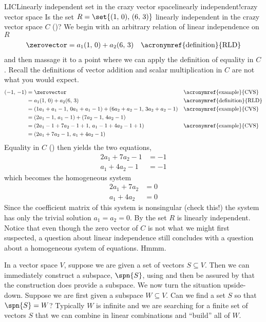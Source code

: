 \begin{example}{LIC}{Linearly independent set in the crazy vector space}{linearly independent!crazy vector space}
Is the set $R=\set{(1,\,0),\,(6,\,3)}$ linearly independent in the crazy vector space $C$ ()?  We begin with an arbitrary relation of linear independence on $R$
%
\begin{align*}
\zerovector &= a_1(1,\,0) + a_2(6,\,3)&&\text{\acronymref{definition}{RLD}}\\
\end{align*}
%
and then massage it to a point where we can apply the definition of equality in $C$.  Recall the definitions of vector addition and scalar multiplication in $C$ are not what you would expect.
%
\begin{align*}
(-1,\,-1)
&=\zerovector
&&\text{\acronymref{example}{CVS}}\\
%
&=a_1(1,\,0) + a_2(6,\,3)
&&\text{\acronymref{definition}{RLD}}\\
%
&=(1a_1+a_1-1,\,0a_1+a_1-1) + (6a_2+a_2-1,\,3a_2+a_2-1)
&&\text{\acronymref{example}{CVS}}\\
%
&=(2a_1-1,\,a_1-1) + (7a_2-1,\,4a_2-1)\\
%
&=(2a_1-1+7a_2-1+1,\,a_1-1+4a_2-1+1)
&&\text{\acronymref{example}{CVS}}\\
%
&=(2a_1+7a_2-1,\,a_1+4a_2-1)
\end{align*}
%
Equality in $C$ () then yields the two equations,
%
\begin{align*}
2a_1+7a_2-1&=-1\\
a_1+4a_2-1&=-1
\end{align*}
%
which becomes the homogeneous system
%
\begin{align*}
2a_1+7a_2&=0\\
a_1+4a_2&=0
\end{align*}
%
Since the coefficient matrix of this system is nonsingular (check this!) the system has only the trivial solution $a_1=a_2=0$.  By  the set $R$ is linearly independent.  Notice that even though the zero vector of $C$ is not what we might first suspected, a question about linear independence still concludes with a question about a homogeneous system of equations.  Hmmm.
%
\end{example}
%
%
In a vector space $V$, suppose we are given a set of vectors $S\subseteq V$.  Then we can immediately construct a subspace, $\spn{S}$, using  and then be assured by  that the construction does provide a subspace.  We now turn the situation upside-down.  Suppose we are first given a subspace $W\subseteq V$.  Can we find a set $S$ so that $\spn{S}=W$?  Typically $W$ is infinite and we are searching for a finite set of vectors $S$ that we can combine in linear combinations and ``build'' all of $W$.\par
